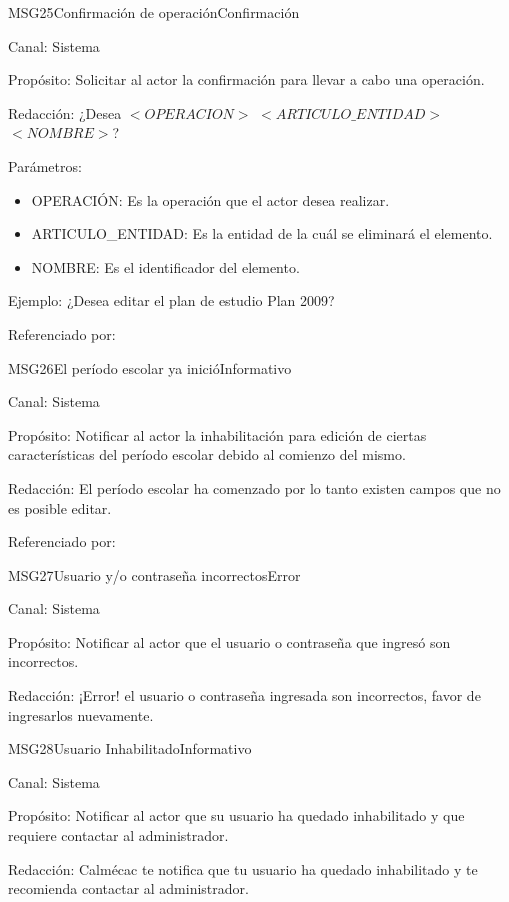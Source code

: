 \begin{mensaje}{MSG25}{Confirmación de operación}{Confirmación}
	\item[Canal:] Sistema
	\item[Propósito:] Solicitar al actor la confirmación para llevar a cabo una operación.
	\item[Redacción:] ¿Desea $<OPERACION>$ $<ARTICULO\_ENTIDAD>$ $<NOMBRE>$?
	\item[Parámetros:] 
	\begin{itemize}
		\item OPERACIÓN: Es la operación que el actor desea realizar.
		\item ARTICULO\_ENTIDAD: Es la entidad de la cuál se eliminará el elemento.
		\item NOMBRE: Es el identificador del elemento.
	\end{itemize}
	\item[Ejemplo:] ¿Desea editar el plan de estudio Plan 2009?
	\item[Referenciado por: ] 
\end{mensaje}

\begin{mensaje}{MSG26}{El período escolar ya inició}{Informativo}
	\item[Canal:] Sistema
	\item[Propósito:] Notificar al actor la inhabilitación para edición de ciertas características del período escolar debido al comienzo del mismo.
	\item[Redacción:] El período escolar ha comenzado por lo tanto existen campos que no es posible editar.
	\item[Referenciado por: ]
\end{mensaje}

\begin{mensaje}{MSG27}{Usuario y/o contraseña incorrectos}{Error}
	\item[Canal:] Sistema
	\item[Propósito:] Notificar al actor que el usuario o contraseña que ingresó son incorrectos.
	\item[Redacción:] ¡Error! el usuario o contraseña ingresada son incorrectos, favor de ingresarlos nuevamente.
\end{mensaje}

\begin{mensaje}{MSG28}{Usuario Inhabilitado}{Informativo}
	\item[Canal:] Sistema
	\item[Propósito:] Notificar al actor que su usuario ha quedado inhabilitado y que requiere contactar al administrador.
	\item[Redacción:] Calmécac te notifica que tu usuario ha quedado inhabilitado y te recomienda contactar al administrador.
\end{mensaje}

